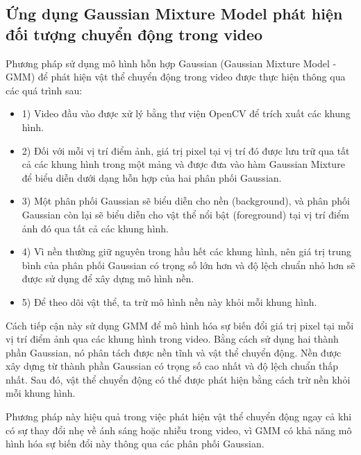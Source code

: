 \documentclass[a4paper]{article}
\begin{document}
\subsection{Ứng dụng Gaussian Mixture Model phát hiện đối tượng chuyển động trong video}
Phương pháp sử dụng mô hình hỗn hợp Gaussian (Gaussian Mixture Model - GMM) để phát hiện vật thể chuyển động trong video được thực hiện thông qua các quá trình sau:
\begin{itemize}[label={}]
    \item 1) Video đầu vào được xử lý bằng thư viện OpenCV để trích xuất các khung hình.
    \item 2) Đối với mỗi vị trí điểm ảnh, giá trị pixel tại vị trí đó được lưu trữ qua tất cả các khung hình trong một mảng và được đưa vào hàm Gaussian Mixture để biểu diễn dưới dạng hỗn hợp của hai phân phối Gaussian.
    \item 3) Một phân phối Gaussian sẽ biểu diễn cho nền (background), và phân phối Gaussian còn lại sẽ biểu diễn cho vật thể nổi bật (foreground) tại vị trí điểm ảnh đó qua tất cả các khung hình.
    \item 4) Vì nền thường giữ nguyên trong hầu hết các khung hình, nên giá trị trung bình của phân phối Gaussian có trọng số lớn hơn và độ lệch chuẩn nhỏ hơn sẽ được sử dụng để xây dựng mô hình nền.
    \item 5) Để theo dõi vật thể, ta trừ mô hình nền này khỏi mỗi khung hình.
\end{itemize}

Cách tiếp cận này sử dụng GMM để mô hình hóa sự biến đổi giá trị pixel tại mỗi vị trí điểm ảnh qua các khung hình trong video. Bằng cách sử dụng hai thành phần Gaussian, nó phân tách được nền tĩnh và vật thể chuyển động. Nền được xây dựng từ thành phần Gaussian có trọng số cao nhất và độ lệch chuẩn thấp nhất. Sau đó, vật thể chuyển động có thể được phát hiện bằng cách trừ nền khỏi mỗi khung hình\cite{background_extraction_video}.

Phương pháp này hiệu quả trong việc phát hiện vật thể chuyển động ngay cả khi có sự thay đổi nhẹ về ánh sáng hoặc nhiễu trong video, vì GMM có khả năng mô hình hóa sự biến đổi này thông qua các phân phối Gaussian.
\end{document}
